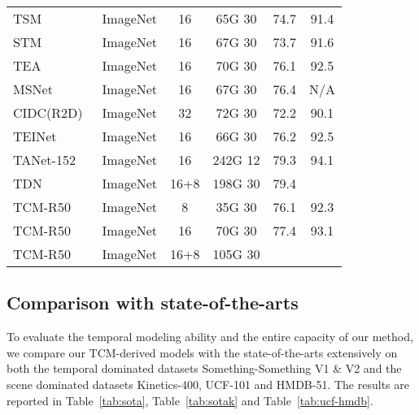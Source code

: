 \documentclass[journal]{IEEEtran}
\begin{document}
\begin{table*}
\begin{tabular}{l|c|c|c|c|c}
TSM~\cite{lin2019tsm}      & ImageNet & 16  & 65G  30    & 74.7           & 91.4          \\
STM~\cite{jiang2019stm}      & ImageNet & 16    & 67G  30  & 73.7           & 91.6    \\
TEA~\cite{li2020tea}    & ImageNet & 16       &  70G   30    & 76.1       &  92.5      \\
MSNet~\cite{kwon2020motionsqueeze}     & ImageNet & 16  & 67G  30  & 76.4           & N/A \\
CIDC(R2D)~\cite{li2020directional}  &ImageNet & 32    & 72G  30   & 72.2           & 90.1 \\
TEINet~\cite{liu2020teinet} & ImageNet &16  & 66G  30    & 76.2           & 92.5           \\
TANet-152~\cite{liu2020tam} & ImageNet &16  & 242G  12   & 79.3           & 94.1           \\
TDN~\cite{wang2021tdn}    & ImageNet  & 16+8  & 198G  30  & 79.4           &   \\
\hline
TCM-R50        & ImageNet & 8      &     35G  30           & 76.1     & 92.3       \\
TCM-R50        & ImageNet & 16     &     70G  30            & 77.4     & 93.1               \\
TCM-R50   & ImageNet & 16+8     &    105G  30      &        &      \\
\hline
\end{tabular}
\end{table*}

\subsection{Comparison with state-of-the-arts}
To evaluate the temporal modeling ability and the entire capacity of our method, we compare our TCM-derived models with the state-of-the-arts extensively on both the temporal dominated datasets Something-Something V1 \& V2 and the scene dominated datasets Kinetics-400, UCF-101 and HMDB-51. The results are reported in Table~\ref{tab:sota}, Table~\ref{tab:sotak} and Table~\ref{tab:ucf-hmdb}.
\end{document}
